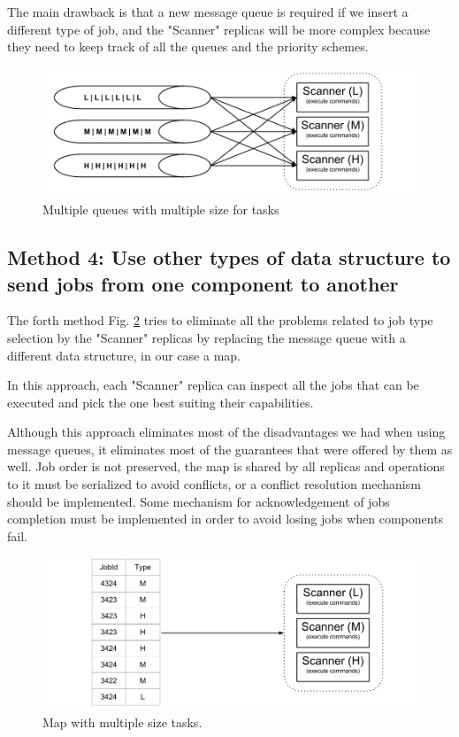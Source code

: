 The main drawback is that a new message queue is required if we insert a different type of job, and the "Scanner" replicas will be more complex because they need to keep track of all the queues and the priority schemes.

\begin{figure}[ht]
\centering
\includegraphics[width=\linewidth]{./img/3_MultipleQueueLoadBalancing.png}
\caption{Multiple queues with multiple size for tasks}
\label{fig:multipleQueueDistributionOfTasks}
\end{figure}

\subsection{Method 4: Use other types of data structure to send jobs from one component to another}
\label{subsection:method4}

The forth method Fig. \ref{fig:mapDistributionOfTasks} tries to eliminate all the problems related to job type selection by the "Scanner" replicas by replacing the message queue with a different data structure, in our case a map. 

In this approach, each "Scanner" replica can inspect all the jobs that can be executed and pick the one best suiting their capabilities.

Although this approach eliminates most of the disadvantages we had when using message queues, it eliminates most of the guarantees that were offered by them as well. Job order is not preserved, the map is shared by all replicas and operations to it must be serialized to avoid conflicts, or a conflict resolution mechanism should be implemented. Some mechanism for acknowledgement of jobs completion must be implemented in order to avoid losing jobs when components fail.

\begin{figure}[ht]
\centering
\includegraphics[width=\linewidth]{./img/4_MapOrOtherDataStructureLoadBalancing.png}
\caption{Map with multiple size tasks.}
\label{fig:mapDistributionOfTasks}
\end{figure}

